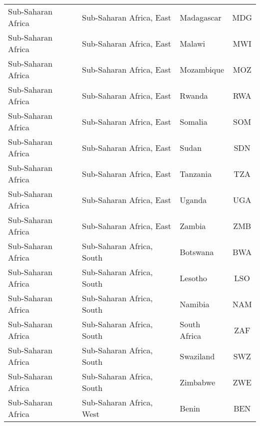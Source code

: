 \begin{longtable}{|p{3cm}|p{3.5cm}|p{5cm}|c|}
            Sub-Saharan Africa &     Sub-Saharan Africa, East &                                        Madagascar &  MDG \\
            Sub-Saharan Africa &     Sub-Saharan Africa, East &                                            Malawi &  MWI \\
            Sub-Saharan Africa &     Sub-Saharan Africa, East &                                        Mozambique &  MOZ \\
            Sub-Saharan Africa &     Sub-Saharan Africa, East &                                            Rwanda &  RWA \\
            Sub-Saharan Africa &     Sub-Saharan Africa, East &                                           Somalia &  SOM \\
            Sub-Saharan Africa &     Sub-Saharan Africa, East &                                             Sudan &  SDN \\
            Sub-Saharan Africa &     Sub-Saharan Africa, East &                                          Tanzania &  TZA \\
            Sub-Saharan Africa &     Sub-Saharan Africa, East &                                            Uganda &  UGA \\
            Sub-Saharan Africa &     Sub-Saharan Africa, East &                                            Zambia &  ZMB \\
            Sub-Saharan Africa &    Sub-Saharan Africa, South &                                          Botswana &  BWA \\
            Sub-Saharan Africa &    Sub-Saharan Africa, South &                                           Lesotho &  LSO \\
            Sub-Saharan Africa &    Sub-Saharan Africa, South &                                           Namibia &  NAM \\
            Sub-Saharan Africa &    Sub-Saharan Africa, South &                                      South Africa &  ZAF \\
            Sub-Saharan Africa &    Sub-Saharan Africa, South &                                         Swaziland &  SWZ \\
            Sub-Saharan Africa &    Sub-Saharan Africa, South &                                          Zimbabwe &  ZWE \\
            Sub-Saharan Africa &     Sub-Saharan Africa, West &                                             Benin &  BEN \\

\end{longtable}
